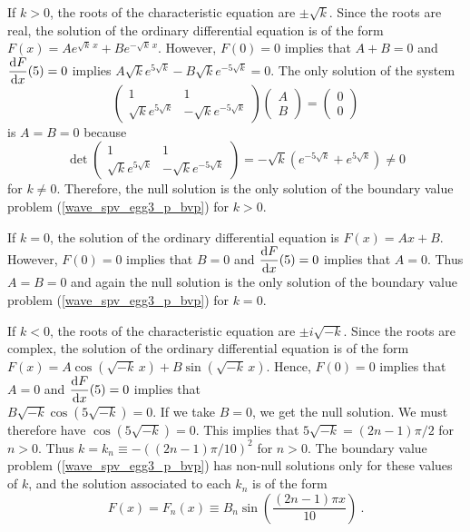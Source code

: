 \begin{egg}
If $k>0$, the roots of the characteristic equation are $\pm \sqrt{k}$.
Since the roots are real, the solution of the ordinary differential
equation is of the form
$\displaystyle F(x) = A e^{\sqrt{k}\,x} + B e^{-\sqrt{k}\, x}$.
However, $F(0)=0$ implies that $A+B=0$ and
$\displaystyle \frac{\mathrm{d}F}{\mathrm{d}{x}}(5)=0$ implies
$\displaystyle A\sqrt{k} e^{5\sqrt{k}} - B\sqrt{k} e^{-5\sqrt{k}} = 0$.
The only solution of the system
\[
\begin{pmatrix}
1 & 1 \\ \sqrt{k} e^{5\sqrt{k}} & -\sqrt{k} e^{-5\sqrt{k}}
\end{pmatrix}
\begin{pmatrix}
A \\ B
\end{pmatrix}
=
\begin{pmatrix}
0 \\ 0 
\end{pmatrix}
\]
is $A=B=0$ because
\[
\det
\begin{pmatrix}
1 & 1 \\ \sqrt{k} e^{5\sqrt{k}} & -\sqrt{k} e^{-5\sqrt{k}}
\end{pmatrix}
= -\sqrt{k} \left(e^{-5\sqrt{k}} + e^{5\sqrt{k}}\right) 
\neq 0
\]
for $k\neq 0$.  Therefore, the null solution is the only solution
of the boundary value problem (\ref{wave_spv_egg3_p_bvp}) for $k>0$.

If $k=0$, the solution of the ordinary differential equation is $F(x)=Ax+B$.
However, $F(0)=0$ implies that $B=0$ and
$\displaystyle \frac{\mathrm{d}F}{\mathrm{d}{x}}(5)=0$ implies that $A = 0$.
Thus $A=B=0$ and again the null solution is the
only solution of the boundary value problem (\ref{wave_spv_egg3_p_bvp})
for $k=0$.

If $k<0$, the roots of the characteristic equation are $\pm i \sqrt{-k}$.
Since the roots are complex, the solution of the ordinary differential
equation is of the form $\displaystyle
F(x) = A \cos\left(\sqrt{-k}\,x\right) + B \sin\left(\sqrt{-k}\,x\right)$.
Hence, $F(0)=0$ implies that $A=0$ and
$\displaystyle \frac{\mathrm{d}F}{\mathrm{d}{x}}(5)=0$ implies that\\
$B \sqrt{-k} \cos(5\sqrt{-k}) = 0$.  If we take
$B=0$, we get the null solution.  We must therefore have
$\cos(5\sqrt{-k}) = 0$.  This implies that
$\displaystyle 5\sqrt{-k} = (2n-1)\pi/2$ for $n >0$. Thus
$\displaystyle k = k_n \equiv -\left((2n-1)\pi/10\right)^2$
for $n>0$.
The boundary value problem (\ref{wave_spv_egg3_p_bvp}) has non-null
solutions only for these values of $k$, and the solution associated
to each $k_n$ is of the form
\[
F(x)=F_n(x) \equiv B_n \sin\left(\frac{(2n-1)\pi x}{10}\right) \  .
\]


\end{egg}
